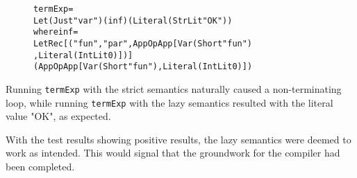 \begin{figure}[H]
\begin{alltt}
  termExp =
    Let (Just "var") (inf) (Literal (StrLit "OK"))
    where inf =
      LetRec [("fun", "par", App OpApp [Var (Short "fun")
                                       ,Literal (IntLit 0)])]
      (App OpApp [Var (Short "fun"), Literal (IntLit 0)])
\end{alltt}
\end{figure}

\noindent Running \texttt{termExp} with the strict semantics naturally caused a
non-terminating loop, while running \texttt{termExp} with the lazy semantics
resulted with the literal value "OK", as expected.

With the test results showing positive results, the lazy semantics were deemed
to work as intended. This would signal that the groundwork for the compiler
had been completed.
